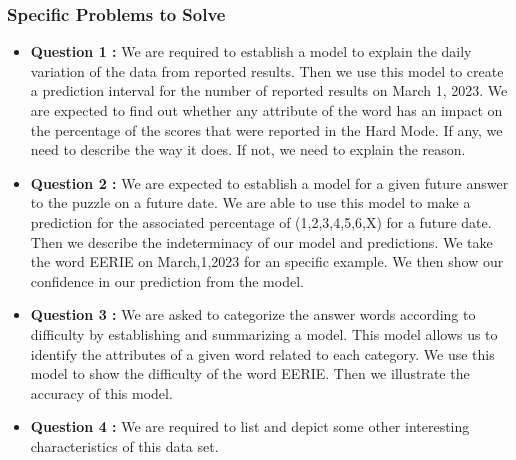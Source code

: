 \documentclass{mcmthesis}
\begin{document}
\subsubsection{Specific Problems to Solve}

\begin{itemize}
    \item {\bf Question 1 :} We are required to establish a model to explain the daily variation of the data from reported results. Then we use this model to create a prediction interval for the number of reported results on March 1, 2023. We are expected to find out whether any attribute of the word has an impact on the percentage of the scores that were reported in the Hard Mode. If any, we need to describe the way it does. If not, we need to explain the reason.
    
    \item {\bf Question 2 :} We are expected to establish a model for a given future answer to the puzzle on a future date. We are able to use this model to make a prediction for the associated percentage of (1,2,3,4,5,6,X) for a future date. Then we describe the indeterminacy of our model and predictions. We take the word EERIE on March,1,2023 for an specific example. We then show our confidence in our prediction from the model.
    
    \item {\bf Question 3 :} We are asked to categorize the answer words according to difficulty by establishing and summarizing a model. This model allows us to identify the attributes of a given word related to each category. We use this model to show the difficulty of the word EERIE. Then we illustrate the accuracy of this model. 
    
    \item {\bf Question 4 :} We are required to list and depict some other interesting characteristics of this data set. 
    \end{itemize}
\end{document}
